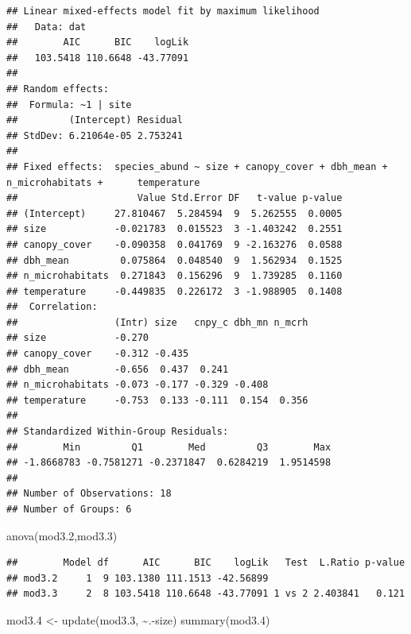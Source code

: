 \documentclass[
]{article}
\newenvironment{Shaded}{\begin{snugshade}}{\end{snugshade}}
\newcommand{\FloatTok}[1]{\textcolor[rgb]{0.00,0.00,0.81}{#1}}
\newcommand{\FunctionTok}[1]{\textcolor[rgb]{0.00,0.00,0.00}{#1}}
\newcommand{\NormalTok}[1]{#1}
\newcommand{\OtherTok}[1]{\textcolor[rgb]{0.56,0.35,0.01}{#1}}
\newcommand{\SpecialCharTok}[1]{\textcolor[rgb]{0.00,0.00,0.00}{#1}}
\begin{document}
\begin{verbatim}
## Linear mixed-effects model fit by maximum likelihood
##   Data: dat 
##        AIC      BIC    logLik
##   103.5418 110.6648 -43.77091
## 
## Random effects:
##  Formula: ~1 | site
##         (Intercept) Residual
## StdDev: 6.21064e-05 2.753241
## 
## Fixed effects:  species_abund ~ size + canopy_cover + dbh_mean + n_microhabitats +      temperature 
##                     Value Std.Error DF   t-value p-value
## (Intercept)     27.810467  5.284594  9  5.262555  0.0005
## size            -0.021783  0.015523  3 -1.403242  0.2551
## canopy_cover    -0.090358  0.041769  9 -2.163276  0.0588
## dbh_mean         0.075864  0.048540  9  1.562934  0.1525
## n_microhabitats  0.271843  0.156296  9  1.739285  0.1160
## temperature     -0.449835  0.226172  3 -1.988905  0.1408
##  Correlation: 
##                 (Intr) size   cnpy_c dbh_mn n_mcrh
## size            -0.270                            
## canopy_cover    -0.312 -0.435                     
## dbh_mean        -0.656  0.437  0.241              
## n_microhabitats -0.073 -0.177 -0.329 -0.408       
## temperature     -0.753  0.133 -0.111  0.154  0.356
## 
## Standardized Within-Group Residuals:
##        Min         Q1        Med         Q3        Max 
## -1.8668783 -0.7581271 -0.2371847  0.6284219  1.9514598 
## 
## Number of Observations: 18
## Number of Groups: 6
\end{verbatim}

\begin{Shaded}
\begin{Highlighting}[]
\FunctionTok{anova}\NormalTok{(mod3}\FloatTok{.2}\NormalTok{,mod3}\FloatTok{.3}\NormalTok{)}
\end{Highlighting}
\end{Shaded}

\begin{verbatim}
##        Model df      AIC      BIC    logLik   Test  L.Ratio p-value
## mod3.2     1  9 103.1380 111.1513 -42.56899                        
## mod3.3     2  8 103.5418 110.6648 -43.77091 1 vs 2 2.403841   0.121
\end{verbatim}

\begin{Shaded}
\begin{Highlighting}[]
\NormalTok{mod3}\FloatTok{.4} \OtherTok{\textless{}{-}} \FunctionTok{update}\NormalTok{(mod3}\FloatTok{.3}\NormalTok{, }\SpecialCharTok{\textasciitilde{}}\NormalTok{.}\SpecialCharTok{{-}}\NormalTok{size)}
\FunctionTok{summary}\NormalTok{(mod3}\FloatTok{.4}\NormalTok{)}
\end{Highlighting}
\end{Shaded}
\end{document}
